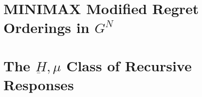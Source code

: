 \documentclass[11pt]{article}
\theoremstyle{boldStyle}
\begin{document}
\newpage
\section{MINIMAX Modified Regret Orderings in $G^N$}





\newpage
\section{The $\underbar{H}, \mu$ Class of Recursive Responses}
\end{document}
